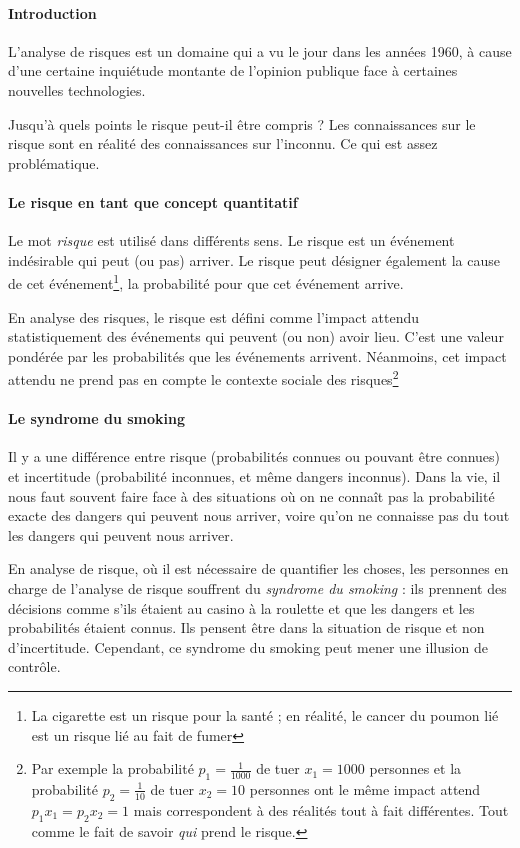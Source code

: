 \documentclass{report}
\begin{document}
	
	\paragraph*{Introduction}
	L'analyse de risques est un domaine qui a vu le jour dans les années 1960, à cause d'une certaine inquiétude montante de l'opinion publique face à certaines nouvelles technologies.
	
	Jusqu'à quels points le risque peut-il être compris ? Les connaissances sur le risque sont en réalité des connaissances sur l'inconnu. Ce qui est assez problématique.
	\paragraph*{Le risque en tant que concept quantitatif} Le mot \textit{risque} est utilisé dans différents sens. Le risque est un événement indésirable qui peut (ou pas) arriver. Le risque peut désigner également la cause de cet événement\footnote{La cigarette est un risque pour la santé ; en réalité, le cancer du poumon lié est un risque lié au fait de fumer}, la probabilité pour que cet événement arrive.
	
	En analyse des risques, le risque est défini comme l'impact attendu statistiquement des événements qui peuvent (ou non) avoir lieu. C'est une valeur pondérée par les probabilités que les événements arrivent. Néanmoins, cet impact attendu ne prend pas en compte le contexte sociale des risques\footnote{Par exemple la probabilité $p_1 = \frac{1}{1000}$ de tuer $x_1=1000$ personnes et la probabilité $p_2=\frac{1}{10}$ de tuer $x_2=10$ personnes ont le même impact attend $p_1x_1=p_2x_2=1$ mais correspondent à des réalités tout à fait différentes. Tout comme le fait de savoir \textit{qui} prend le risque.}
	\paragraph*{Le syndrome du smoking}
	Il y a une différence entre risque (probabilités connues ou pouvant être connues) et incertitude (probabilité inconnues, et même dangers inconnus). Dans la vie, il nous faut souvent faire face à des situations où on ne connaît pas la probabilité exacte des dangers qui peuvent nous arriver, voire qu'on ne connaisse pas du tout les dangers qui peuvent nous arriver.
	
	En analyse de risque, où il est nécessaire de quantifier les choses, les personnes en charge de l'analyse de risque souffrent du \emph{syndrome du smoking} : ils prennent des décisions comme s'ils étaient au casino à la roulette et que les dangers et les probabilités étaient connus. Ils pensent être dans la situation de risque et non d'incertitude. Cependant, ce syndrome du smoking peut mener une illusion de contrôle.
\end{document}
